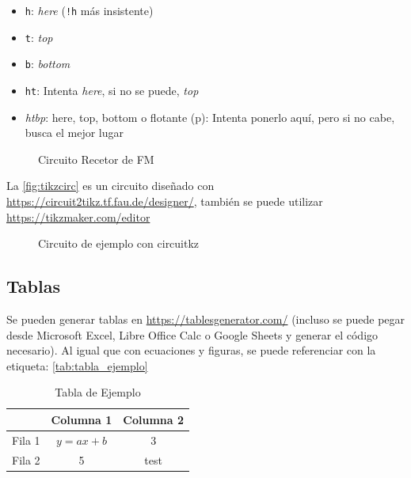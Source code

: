 \begin{itemize}
    \item \texttt{h}: \textit{here} (\texttt{!h} más insistente)
    \item \texttt{t}: \textit{top}
    \item \texttt{b}: \textit{bottom}
    \item \texttt{ht}: Intenta \textit{here}, si no se puede, \textit{top}
    \item \textit{htbp}: here, top, bottom o flotante (p): Intenta ponerlo aquí, pero si no cabe, busca el mejor lugar
\end{itemize}

\begin{figure}[htbp]
    \centering
    \caption{Circuito Recetor de FM}
    \label{fig:fm_radio_receiver}
\end{figure}

La \autoref{fig:tikzcirc} es un circuito diseñado con \url{https://circuit2tikz.tf.fau.de/designer/}, también se puede utilizar \url{https://tikzmaker.com/editor}

\begin{figure}[htbp]
    \centering
    \caption{Circuito de ejemplo con circuitkz}
    \label{fig:tikzcirc}
\end{figure}


\subsection{Tablas}

Se pueden generar tablas en \url{https://tablesgenerator.com/} (incluso se puede pegar desde Microsoft Excel, Libre Office Calc o Google Sheets y generar el código necesario). Al igual que con ecuaciones y figuras, se puede referenciar con la etiqueta: \autoref{tab:tabla_ejemplo}

\begin{table}[!h]
\centering
\begin{tabular}{|c|c|c|}
\hline
\rowcolor[HTML]{9698ED} 
\textbf{} & \textbf{Columna 1} & \textbf{Columna 2} \\ \hline
Fila 1 & $y = ax + b$ & 3 \\ \hline
Fila 2 & 5 & test \\ \hline
\end{tabular}
\caption{Tabla de Ejemplo}
\label{tab:tabla_ejemplo}
\end{table}

